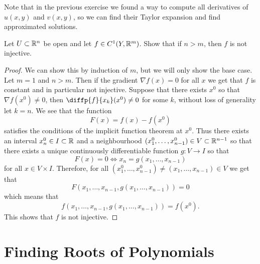 \documentclass[11pt,a4paper]{article}
\begin{document}
\begin{remark}
  Note that in the previous exercise we found a way to compute
  all derivatives of $u(x,y)$ and $v(x,y)$,
  so we can find their Taylor expansion and find approximated solutions.
\end{remark}
\begin{proposition}
  Let $U \subset \mathbb{R}^n$ be open and let $f \in C^1(Y,\mathbb{R}^m)$.
  Show that if $n > m$, then $f$ is not injective.
\end{proposition}
\begin{proof}
  We can show this by induction of $m$,
  but we will only show the base case.
  Let $m = 1$ and $n > m$.
  Then if the gradient $\nabla f(x) = 0$ for all $x$
  we get that $f$ is constant and in particular not injective.
  Suppose that there exists $x^0$ so that $\nabla f(x^0) \neq 0$,
  then $\diffp{f}{{x_k}}(x^0) \neq 0$ for some $k$,
  without loss of generality let $k = n$.
  We see that the function
  \[
    F(x) = f(x) - f(x^0)
  \]
  satisfies the conditions of the implicit function theorem at $x^0$.
  Thus there exists an interval $x^0_n \in I \subset \mathbb{R}$
  and a neighbourhood $(x^0_1,\dots,x^0_{n-1}) \in V \subset \mathbb{R}^{n-1}$
  so that there exists a unique continuously differentiable function
  $g \colon V \to I$ so that
  \[
    F(x) = 0 \iff x_n = g(x_1,\dots,x_{n-1})
  \]
  for all $x \in V \times I$.
  Therefore, for all $(x^0_1,\dots,x^0_{n-1}) \neq (x_1,\dots,x_{n-1}) \in V$
  we get that
  \[
    F(x_1,\dots,x_{n-1},g(x_1,\dots,x_{n-1})) = 0
  \]
  which means that
  \[
    f(x_1,\dots,x_{n-1},g(x_1,\dots,x_{n-1})) = f(x^0).
  \]
  This shows that $f$ is not injective.
\end{proof}

\newpage

\section{Finding Roots of Polynomials}
\end{document}
